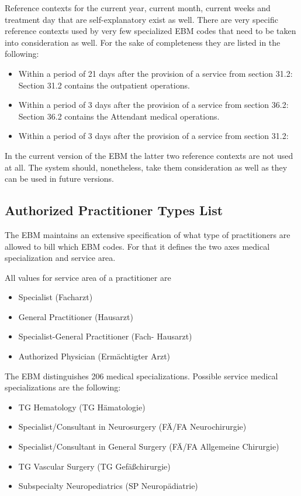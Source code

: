 Reference contexts for the current year, current month, current weeks and treatment day that are self-explanatory exist as well.
There are very specific reference contexts used by very few specialized EBM codes that need to be taken into consideration as well.
For the sake of completeness they are listed in the following:
\begin{itemize}
    \item Within a period of 21 days after the provision of a service from section 31.2:
    Section 31.2 contains the \glqq outpatient operations\glqq.
    \item Within a period of 3 days after the provision of a service from section 36.2:
    Section 36.2 contains the \glqq Attendant medical operations\glqq.
    \item Within a period of 3 days after the provision of a service from section 31.2:
\end{itemize}
In the current version of the EBM the latter two reference contexts are not used at all.
The system should, nonetheless, take them consideration as well as they can be used in future versions.




\subsection{Authorized Practitioner Types List}

The EBM maintains an extensive specification of what type of practitioners are allowed to bill which EBM codes.
For that it defines the two axes medical specialization and service area.

All values for service area of a practitioner are
\begin{itemize}
    \item Specialist (Facharzt)
    \item General Practitioner (Hausarzt)
    \item Specialist-General Practitioner (Fach- Hausarzt)
    \item Authorized Physician (Ermächtigter Arzt)
\end{itemize}

The EBM distinguishes 206 medical specializations.
Possible service medical specializations are the following:
\begin{itemize}
    \item TG Hematology (TG Hämatologie)
    \item Specialist/Consultant in Neurosurgery (FÄ/FA Neurochirurgie)
    \item Specialist/Consultant in General Surgery (FÄ/FA Allgemeine Chirurgie)
    \item TG Vascular Surgery (TG Gefäßchirurgie)
    \item Subspecialty Neuropediatrics (SP Neuropädiatrie)
\end{itemize}

